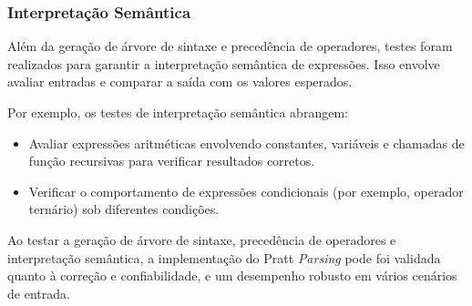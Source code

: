 \documentclass[english, 
               brazil, 
               bsc] %
               {dcomp-abntex2}
\begin{document}
%
%
%
%
\subsubsection{Interpretação Semântica}

Além da geração de árvore de sintaxe e precedência de operadores, testes foram realizados para garantir a interpretação semântica de expressões. Isso envolve avaliar entradas e comparar a saída com os valores esperados.

Por exemplo, os testes de interpretação semântica abrangem:

\begin{itemize}
    \item Avaliar expressões aritméticas envolvendo constantes, variáveis e chamadas de função recursivas para verificar resultados corretos.
    \item Verificar o comportamento de expressões condicionais (por exemplo, operador ternário) sob diferentes condições.
\end{itemize}

Ao testar a geração de árvore de sintaxe, precedência de operadores e interpretação semântica, a implementação do Pratt \textit{Parsing} pode foi validada quanto à correção e confiabilidade, e um desempenho robusto em vários cenários de entrada.
\end{document}

